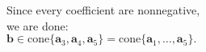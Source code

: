 \documentclass[preview]{standalone}
\renewcommand{\vec}{\mathbf}
\begin{document}
\begin{center}
Since every coefficient are nonnegative,\\we are done:\\$\vec{b}\in\text{cone}\lbrace\vec{a}_3,\vec{a}_4,\vec{a}_5\rbrace=\text{cone}\lbrace\vec{a}_1,\ldots,\vec{a}_5\rbrace.$
\end{center}
\end{document}
